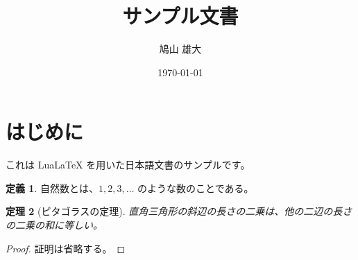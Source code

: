 \documentclass[11pt]{ltjsarticle} %
\title{サンプル文書}
\author{鳩山 雄大}
\date{\today}
\newtheorem{thm}{定理}[section]
\theoremstyle{definition}
\newtheorem{dfn}[thm]{定義}
\theoremstyle{remark}
\begin{document}
\maketitle

\section{はじめに}

これは LuaLaTeX を用いた日本語文書のサンプルです。

\begin{dfn}
自然数とは、$1, 2, 3, \ldots$ のような数のことである。
\end{dfn}

\begin{thm}[ピタゴラスの定理]
直角三角形の斜辺の長さの二乗は、他の二辺の長さの二乗の和に等しい。
\end{thm}

\begin{proof}
証明は省略する。
\end{proof}
\end{document}
